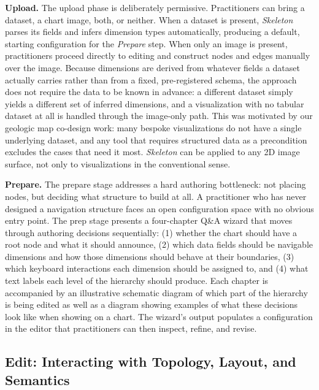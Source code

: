 \documentclass[12pt]{cmuthesis}
\begin{document}
\textbf{Upload.} The upload phase is deliberately permissive. Practitioners can bring a dataset, a chart image, both, or neither. When a dataset is present, \textit{Skeleton} parses its fields and infers dimension types automatically, producing a default, starting configuration for the \textit{Prepare} step. When only an image is present, practitioners proceed directly to editing and construct nodes and edges manually over the image. Because dimensions are derived from whatever fields a dataset actually carries rather than from a fixed, pre-registered schema, the approach does not require the data to be known in advance: a different dataset simply yields a different set of inferred dimensions, and a visualization with no tabular dataset at all is handled through the image-only path. This was motivated by our geologic map co-design work: many bespoke visualizations do not have a single underlying dataset, and any tool that requires structured data as a precondition excludes the cases that need it most. \textit{Skeleton} can be applied to any 2D image surface, not only to visualizations in the conventional sense.

\textbf{Prepare.} The prepare stage addresses a hard authoring bottleneck: not placing nodes, but deciding what structure to build at all. A practitioner who has never designed a navigation structure faces an open configuration space with no obvious entry point. The prep stage presents a four-chapter Q\&A wizard that moves through authoring decisions sequentially: (1) whether the chart should have a root node and what it should announce, (2) which data fields should be navigable dimensions and how those dimensions should behave at their boundaries, (3) which keyboard interactions each dimension should be assigned to, and (4) what text labels each level of the hierarchy should produce. Each chapter is accompanied by an illustrative schematic diagram of which part of the hierarchy is being edited as well as a diagram showing examples of what these decisions look like when showing on a chart. The wizard's output populates a configuration in the editor that practitioners can then inspect, refine, and revise.

\subsection{Edit: Interacting with Topology, Layout, and Semantics}
\end{document}
